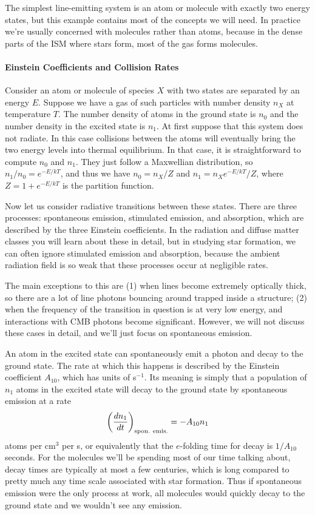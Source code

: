 The simplest line-emitting system is an atom or molecule with exactly two energy states, but this example contains most of the concepts we will need. In practice we're usually concerned with molecules rather than atoms, because in the dense parts of the ISM where stars form, most of the gas forms molecules.

\paragraph{Einstein Coefficients and Collision Rates}

Consider an atom or molecule of species $X$ with two states are separated by an energy $E$. Suppose we have a gas of such particles with number density $n_X$ at temperature $T$. The number density of atoms in the ground state is $n_0$ and the number density in the excited state is $n_1$. At first suppose that this system does not radiate. In this case collisions between the atoms will eventually bring the two energy levels into thermal equilibrium. In that case, it is straightforward to compute $n_0$ and $n_1$. They just follow a Maxwellian distribution, so $n_1/n_0 = e^{-E/kT}$, and thus we have $n_0 = n_X /Z$ and $n_1 = n_X e^{-E/kT}/Z$, where $Z=1+e^{-E/kT}$ is the partition function.

Now let us consider radiative transitions between these states. There are three processes: spontaneous emission, stimulated emission, and absorption, which are described by the three Einstein coefficients. In the radiation and diffuse matter classes you will learn about these in detail, but in studying star formation, we can often ignore stimulated emission and absorption, because the ambient radiation field is so weak that these processes occur at negligible rates.

The main exceptions to this are (1) when lines become extremely optically thick, so there are a lot of line photons bouncing around trapped inside a structure; (2) when the frequency of the transition in question is at very low energy, and interactions with CMB photons become significant. However, we will not discuss these cases in detail, and we'll just focus on spontaneous emission.

An atom in the excited state can spontaneously emit a photon and decay to the ground state. The rate at which this happens is described by the Einstein coefficient $A_{10}$, which has units of s$^{-1}$. Its meaning is simply that a population of $n_1$ atoms in the excited state will decay to the ground state by spontaneous emission at a rate 
\begin{equation}
\left(\frac{dn_1}{dt}\right)_{\rm spon.~emis.} = -A_{10} n_1
\end{equation}
atoms per cm$^3$ per s, or equivalently that the $e$-folding time for decay is $1/A_{10}$ seconds. For the molecules we'll be spending most of our time talking about, decay times are typically at most a few centuries, which is long compared to pretty much any time scale associated with star formation. Thus if spontaneous emission were the only process at work, all molecules would quickly decay to the ground state and we wouldn't see any emission.


